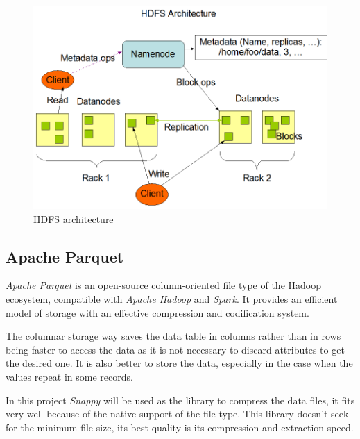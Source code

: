 \begin{figure}[htp!]
	\centering
	\caption{\gls{HDFS} architecture \cite{hadoop}}
	\label{hdfsarchitectureEng}
	\vspace{5pt}
	\includegraphics[scale=0.6]{graphics/hdfsarchitecture}
\end{figure}

\subsection{Apache Parquet}
\textit{Apache Parquet} \cite{parquet} is an open-source column-oriented file type of the Hadoop ecosystem, compatible with \textit{Apache Hadoop} and \textit{Spark}. It provides an efficient model of storage with an effective compression and codification system.

The columnar storage way saves the data table in columns rather than in rows being faster to access the data as it is not necessary to discard attributes to get the desired one. It is also better to store the data, especially in the case when the values repeat in some records.

In this project \textit{Snappy} \cite{snappyLib} will be used as the library to compress the data files, it fits very well because of the native support of the file type. This library doesn’t seek for the minimum file size, its best quality is its compression and extraction speed.

